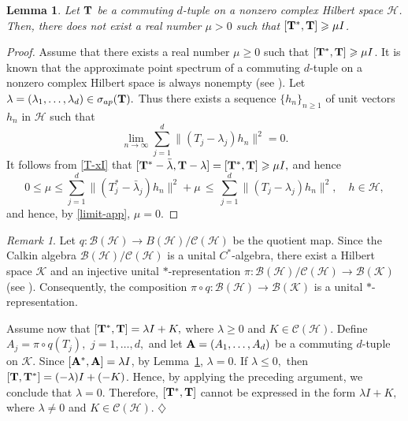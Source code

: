 \documentclass[10pt, a4paper, oneside, reqno]{amsproc}
\numberwithin{equation}{section}
\newtheorem{lemma}[theorem]{Lemma}
\theoremstyle{remark}
\newtheorem{remark}[theorem]{Remark}
\theoremstyle{definition}
\newcommand*{\Ge}{\geqslant}
\newcommand*{\Le}{\leqslant}
\begin{document}
\begin{lemma}\label{comnotbb}
Let ${\bf T}$ be a commuting $d$-tuple on a nonzero complex Hilbert space $\mathcal H$. Then, there does not exist a real number $\mu > 0$
such that $[{\bf T}^*, {\bf T}] \Ge \mu I$.
\end{lemma}
\begin{proof}  
Assume that there exists a real number $\mu \Ge 0$ such that $[{\bf T}^*, {\bf T}] \Ge \mu I$. 
It is known that the approximate point spectrum of a commuting $d$-tuple on a nonzero complex Hilbert space is always nonempty (see \cite[Proposition~2]{B1971}).
Let $\lambda = (\lambda_1, \ldots, \lambda_d) \in \sigma_{ap}({\bf T}).$  
Thus there exists a sequence $\{h_n\}_{n \Ge 1}$ of unit vectors $h_n$ in $\mathcal H$ such that
\begin{equation}
\label{limit-app}
\lim_{n \rightarrow \infty}\sum_{j=1}^d \|(T_j-\lambda_j)h_n\|^2 =0.
\end{equation}
It follows from \eqref{T-xI} that $[{\bf T}^*- \bar{\lambda}, {\bf T}-\lambda] =  [{\bf T}^*, {\bf T}]\Ge \mu I,$ and hence 
\begin{equation*}
0 \Le \mu \Le \sum_{j=1}^d \|(T^{*}_j-\bar{\lambda}_j)h_n\|^2 + \mu \,\Le \, \sum_{j=1}^d \|(T_j-\lambda_j)h_n\|^2, \quad h \in \mathcal H,
\end{equation*}
and hence, by \eqref{limit-app}, $\mu =0$.
\end{proof}
\begin{remark}
\label{scalar-cpt}
Let $q : \mathcal B(\mathcal H) \rightarrow
B(\mathcal H)/ {\mathcal C}(\mathcal H)$ be the quotient 
map.
Since the Calkin algebra $\mathcal B(\mathcal H) / {\mathcal
C}(\mathcal H)$ is a unital $C^*$-algebra, there exist a Hilbert space $\mathcal K$ and
an injective unital $*$-representation $\pi : \mathcal B(\mathcal H) /
{\mathcal C}(\mathcal H) \rightarrow \mathcal B(\mathcal K)$ (see \cite[Chapter
VIII]{Co1990}). Consequently, the composition $\pi \circ q : \mathcal B(\mathcal H) \rightarrow \mathcal B(\mathcal
K)$ is a unital $*$-representation. 

Assume now that $[{\bf T}^*, {\bf T}]=\lambda I + K,$ where $\lambda \Ge 0$ and $K \in {\mathcal C}(\mathcal H)$.
Define $A_j = \pi \circ q(T_j),$ $j=1, \ldots, d,$ and let ${\bf A}=(A_1, \ldots, A_d)$ be a commuting $d$-tuple on $\mathcal K$. Since $[{\bf A}^*, {\bf A}]=\lambda I$, by Lemma~\ref{comnotbb}, $\lambda =0$. If $\lambda \Le 0,$ then $[{\bf T}, {\bf T}^*]=(-\lambda) I + (-K)$. Hence, by applying the preceding argument, we conclude that $\lambda =0.$
Therefore, 
$[{\bf T}^*, {\bf T}]$ cannot be expressed in the form $\lambda I + K,$ where $\lambda \neq 0$ and $K \in {\mathcal C}(\mathcal H)$. \hfill $\diamondsuit$
\end{remark}
\end{document}
